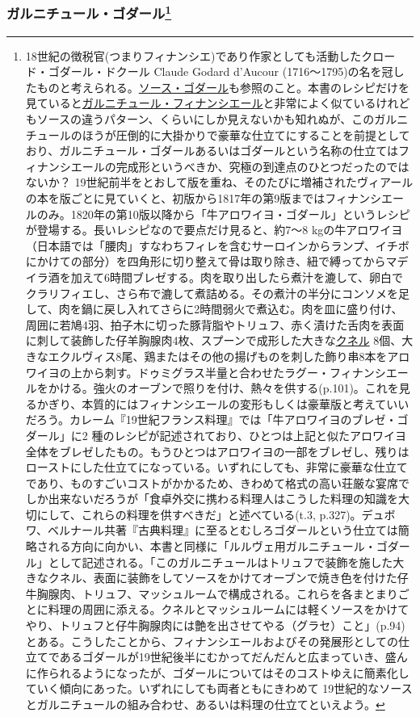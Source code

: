 \begin{recette}
{\subsubsection[ガルニチュール・ゴダール]{\texorpdfstring{ガルニチュール・ゴダール\footnote{18世紀の徴税官(つまりフィナンシエ)であり作家としても活動したクロード・ゴダール・ドクール
  Claude Godard d'Aucour
  (1716〜1795)の名を冠したものと考えられる。\protect\hyperlink{sauce-godard}{ソース・ゴダール}も参照のこと。本書のレシピだけを見ていると\protect\hyperlink{garniture-a-la-financiere}{ガルニチュール・フィナンシエール}と非常によく似ているけれどもソースの違うパターン、くらいにしか見えないかも知れぬが、このガルニチュールのほうが圧倒的に大掛かりで豪華な仕立てにすることを前提としており、ガルニチュール・ゴダールあるいはゴダールという名称の仕立てはフィナンシエールの完成形というべきか、究極の到達点のひとつだったのではないか？
  19世紀前半をとおして版を重ね、そのたびに増補されたヴィアールの本を版ごとに見ていくと、初版から1817年の第9版まではフィナンシエールのみ。1820年の第10版以降から「牛アロワイヨ・ゴダール」というレシピが登場する。長いレシピなので要点だけ見ると、約7〜8
  kgの牛アロワイヨ（日本語では「腰肉」すなわちフィレを含むサーロインからランプ、イチボにかけての部分）を四角形に切り整えて骨は取り除き、紐で縛ってからマデイラ酒を加えて6時間ブレゼする。肉を取り出したら煮汁を漉して、卵白でクラリフィエし、さら布で漉して煮詰める。その煮汁の半分にコンソメを足して、肉を鍋に戻し入れてさらに2時間弱火で煮込む。肉を皿に盛り付け、周囲に若鳩4羽、拍子木に切った豚背脂やトリュフ、赤く漬けた舌肉を表面に刺して装飾した仔羊胸腺肉4枚、スプーンで成形した大きな\protect\hyperlink{quenelles-diverses}{クネル}
  8個、大きなエクルヴィス8尾、鶏またはその他の揚げものを刺した飾り串8本をアロワイヨの上から刺す。ドゥミグラス半量と合わせたラグー・フィナンシエールをかける。強火のオーブンで照りを付け、熱々を供する(p.101)。これを見るかぎり、本質的にはフィナンシエールの変形もしくは豪華版と考えていいだろう。カレーム『19世紀フランス料理』では「牛アロワイヨのブレゼ・ゴダール」に2
  種のレシピが記述されており、ひとつは上記と似たアロワイヨ全体をブレゼしたもの。もうひとつはアロワイヨの一部をブレゼし、残りはローストにした仕立てになっている。いずれにしても、非常に豪華な仕立てであり、ものすごいコストがかかるため、きわめて格式の高い荘厳な宴席でしか出来ないだろうが「食卓外交に携わる料理人はこうした料理の知識を大切にして、これらの料理を供すべきだ」と述べている(t.3,
  p.327)。デュボワ、ベルナール共著『古典料理』に至るとむしろゴダールという仕立ては簡略される方向に向かい、本書と同様に「ルルヴェ用ガルニチュール・ゴダール」として記述される。「このガルニチュールはトリュフで装飾を施した大きなクネル、表面に装飾をしてソースをかけてオーブンで焼き色を付けた仔牛胸腺肉、トリュフ、マッシュルームで構成される。これらを各まとまりごとに料理の周囲に添える。クネルとマッシュルームには軽くソースをかけてやり、トリュフと仔牛胸腺肉には艶を出させてやる（グラセ）こと」(p.94)とある。こうしたことから、フィナンシエールおよびその発展形としての仕立てであるゴダールが19世紀後半にむかってだんだんと広まっていき、盛んに作られるようになったが、ゴダールについてはそのコストゆえに簡素化していく傾向にあった。いずれにしても両者ともにきわめて
  19世紀的なソースとガルニチュールの組み合わせ、あるいは料理の仕立てといえよう。}}{ガルニチュール・ゴダール}}\label{garniture-godard}}


\end{recette}
